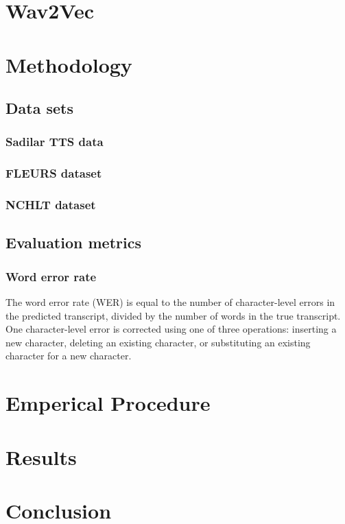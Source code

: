 \documentclass[conference]{IEEEtran}
\begin{document}
\section{Wav2Vec}



\section{Methodology}\label{sec:methodology}

\subsection{Data sets}
\subsubsection{Sadilar TTS data}
\subsubsection{FLEURS dataset}
\subsubsection{NCHLT dataset}

\subsection{Evaluation metrics}
\subsubsection{Word error rate}
The word error rate (WER) is equal to the number of character-level errors in the predicted transcript, 
divided by the number of words in the true transcript. One character-level error is corrected using one of three operations:
inserting a new character, deleting an existing character, or substituting an existing character for a new character.

\section{Emperical Procedure}


\section{Results}\label{sec:results}



\section{Conclusion}\label{sec:conclusion}



\begin{thebibliography}{1}

\end{thebibliography}
\end{document}
